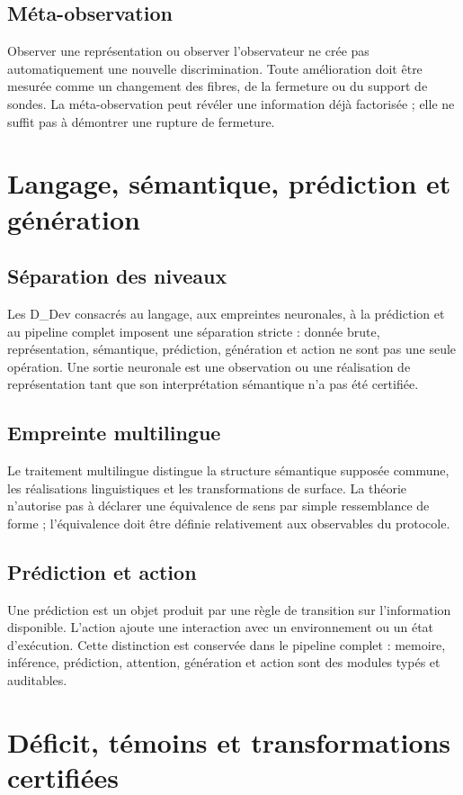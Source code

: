 \documentclass[11pt,a4paper,openany]{book}
\begin{document}
\section{Méta-observation}
Observer une représentation ou observer l'observateur ne crée pas automatiquement une nouvelle discrimination. Toute amélioration doit être mesurée comme un changement des fibres, de la fermeture ou du support de sondes. La méta-observation peut révéler une information déjà factorisée ; elle ne suffit pas à démontrer une rupture de fermeture.

\chapter{Langage, sémantique, prédiction et génération}
\section{Séparation des niveaux}
Les D\_Dev consacrés au langage, aux empreintes neuronales, à la prédiction et au pipeline complet imposent une séparation stricte : donnée brute, représentation, sémantique, prédiction, génération et action ne sont pas une seule opération. Une sortie neuronale est une observation ou une réalisation de représentation tant que son interprétation sémantique n'a pas été certifiée.

\section{Empreinte multilingue}
Le traitement multilingue distingue la structure sémantique supposée commune, les réalisations linguistiques et les transformations de surface. La théorie n'autorise pas à déclarer une équivalence de sens par simple ressemblance de forme ; l'équivalence doit être définie relativement aux observables du protocole.

\section{Prédiction et action}
Une prédiction est un objet produit par une règle de transition sur l'information disponible. L'action ajoute une interaction avec un environnement ou un état d'exécution. Cette distinction est conservée dans le pipeline complet : memoire, inférence, prédiction, attention, génération et action sont des modules typés et auditables.

\chapter{Déficit, témoins et transformations certifiées}
\end{document}
